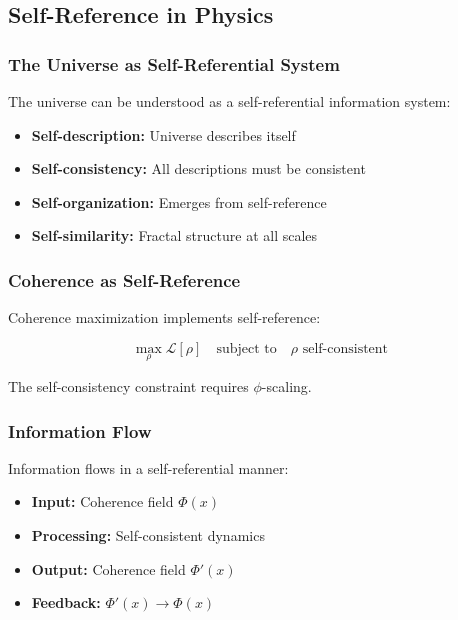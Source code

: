 \documentclass[11pt]{article}
\theoremstyle{definition}
\newcommand{\goldenratio}{\phi}
\newcommand{\density}{\rho}
\begin{document}
\subsection{Self-Reference in Physics}

\subsubsection{The Universe as Self-Referential System}

The universe can be understood as a self-referential information system:

\begin{itemize}
\item \textbf{Self-description:} Universe describes itself
\item \textbf{Self-consistency:} All descriptions must be consistent
\item \textbf{Self-organization:} Emerges from self-reference
\item \textbf{Self-similarity:} Fractal structure at all scales
\end{itemize}

\subsubsection{Coherence as Self-Reference}

Coherence maximization implements self-reference:

\begin{equation}
\max_{\density} \mathcal{L}[\density] \quad \text{subject to} \quad \density \text{ self-consistent}
\end{equation}

The self-consistency constraint requires $\goldenratio$-scaling.

\subsubsection{Information Flow}

Information flows in a self-referential manner:

\begin{itemize}
\item \textbf{Input:} Coherence field $\Phi(x)$
\item \textbf{Processing:} Self-consistent dynamics
\item \textbf{Output:} Coherence field $\Phi'(x)$
\item \textbf{Feedback:} $\Phi'(x) \to \Phi(x)$
\end{itemize}
\end{document}
